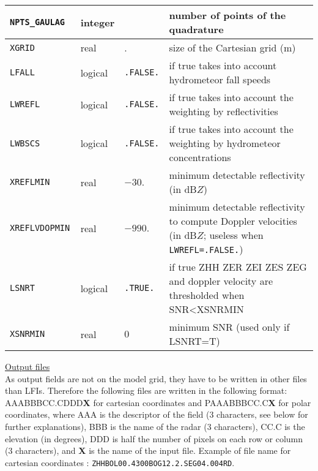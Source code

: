 \begin{center}
\begin{tabular}{|>{\centering}p{2.6cm}|>{\centering}p{3.5cm}|>{\centering}p{1.5cm}| p{8.2cm}|}\hline
	
\tt NPTS\_GAULAG  &integer  & 7&number of points of the quadrature\\\hline
\tt XGRID         &real     & 2000.& size of the Cartesian grid (m)\\\hline
\tt LFALL         &logical  &  \tt.FALSE.&if true takes into account hydrometeor fall speeds\\\hline
\tt LWREFL        &logical  &  \tt.FALSE.&if true takes into account the weighting by reflectivities\\\hline
\tt LWBSCS        &logical  &  \tt.FALSE.&if true takes into account the weighting by hydrometeor concentrations\\\hline
\tt XREFLMIN      &real     & $-30.$& minimum detectable reflectivity (in dB$Z$)\\\hline
\tt XREFLVDOPMIN  & real    & $-990.$&minimum detectable reflectivity to compute Doppler velocities (in dB$Z$; useless when \texttt{LWREFL=.FALSE.})\\\hline
\tt LSNRT         &logical  &  \tt.TRUE.&if true ZHH ZER ZEI ZES ZEG and doppler velocity are thresholded when SNR<XSNRMIN\\\hline
\tt XSNRMIN      &real     & $0$& minimum SNR (used only if LSNRT=T)\\\hline
	
\end{tabular}
\end{center}

\underline{Output files}\\
As output fields are not on the model grid, they have to be written in other files than LFIs. Therefore the following files are written in the following format: AAABBBCC.CDDD{\bf X} for cartesian coordinates and PAAABBBCC.C{\bf X} for polar coordinates, where AAA is the descriptor of the field (3 characters, see below for further explanations), BBB is the name of the radar (3 characters), CC.C is the elevation (in degrees), DDD is half the number of pixels on each row or column (3 characters), and {\bf X} is the name of the input file. Example of file name for cartesian coordinates : {\tt ZHHBOL00.4300BOG12.2.SEG04.004RD}.

